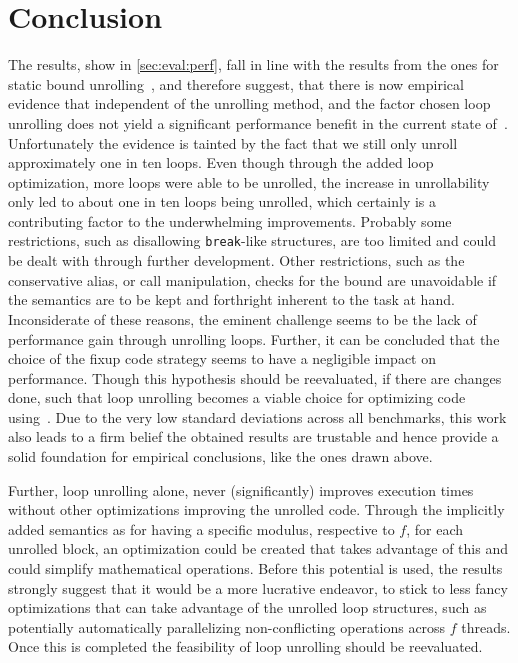 \chapter{Conclusion}\label{sec:conclusion}

The results, show in \cref{sec:eval:perf}, fall in line with the results from the ones for static bound unrolling~\cite{aebi18bachelorarbeit}, and therefore suggest, that there is now empirical evidence that independent of the unrolling method, and the factor chosen loop unrolling does not yield a significant performance benefit in the current state of~\libFIRM.
Unfortunately the evidence is tainted by the fact that we still only unroll approximately one in ten loops.
Even though through the added loop optimization, more loops were able to be unrolled, the increase in unrollability only led to about one in ten loops being unrolled, which certainly is a contributing factor to the underwhelming improvements.
Probably some restrictions, such as disallowing \texttt{break}-like structures, are too limited and could be dealt with through further development.
Other restrictions, such as the conservative alias, or call manipulation, checks for the bound are unavoidable if the semantics are to be kept and forthright inherent to the task at hand.
Inconsiderate of these reasons, the eminent challenge seems to be the lack of performance gain through unrolling loops.
Further, it can be concluded that the choice of the fixup code strategy seems to have a negligible impact on performance.
Though this hypothesis should be reevaluated, if there are changes done, such that loop unrolling becomes a viable choice for optimizing code using~\libFIRM.
Due to the very low standard deviations across all benchmarks, this work also leads to a firm belief the obtained results are trustable and hence provide a solid foundation for empirical conclusions, like the ones drawn above.

Further, loop unrolling alone, never (significantly) improves execution times without other optimizations improving the unrolled code.
Through the implicitly added semantics as for having a specific modulus, respective to $f$, for each unrolled block, an optimization could be created that takes advantage of this and could simplify mathematical operations.
Before this potential is used, the results strongly suggest that it would be a more lucrative endeavor, to stick to less fancy optimizations that can take advantage of the unrolled loop structures, such as potentially automatically parallelizing non-conflicting operations across $f$ threads.
Once this is completed the feasibility of loop unrolling should be reevaluated.


